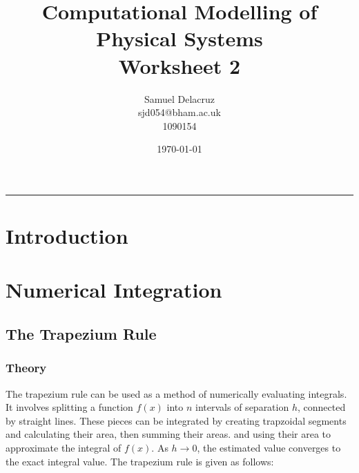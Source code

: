 \documentclass[pdf,color]{UoBnote}
\author{Samuel Delacruz\\
				sjd054@bham.ac.uk\\
				1090154}
\title{Computational Modelling of Physical Systems\\Worksheet 2}
\date{\today}
\begin{document}

\maketitle
\tableofcontents
\vspace{1cm}\hrule \vspace{1cm}

\section{Introduction}
\section{Numerical Integration}
	\subsection{The Trapezium Rule}
		\subsubsection{Theory}
			The trapezium rule can be used as a method of numerically evaluating integrals. It involves splitting a function $f(x)$ into $n$ intervals of separation $h$,
			connected by straight lines. These pieces can be integrated by creating trapzoidal segments and calculating their area, then summing their areas.
			and using their area to approximate the integral of $f(x)$. As $h \rightarrow 0$, the estimated value converges to the exact integral value. The trapezium rule is given as follows:
			
\end{document}
